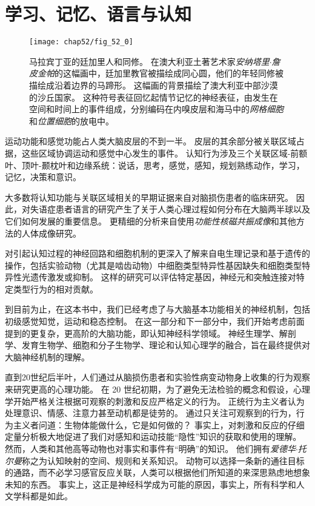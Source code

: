 \part{学习、记忆、语言与认知}


\begin{figure}[htbp]
	\centering
	\texttt{[image: chap52/fig\_52\_0]}
	\caption{马拉宾丁亚的廷加里人和同修。
		在澳大利亚土著艺术家\textit{安纳塔里$\cdot$詹皮金帕}的这幅画中，廷加里教官被描绘成同心圆，他们的年轻同修被描绘成沿着边界的马蹄形。
		这幅画的背景描绘了澳大利亚中部沙漠的沙丘国家。
		这种符号表征回忆起情节记忆的神经表征，由发生在空间和时间上的事件组成，分别编码在内嗅皮层和海马中的\textit{网格细胞}和\textit{位置细胞}的放电中。}
	\label{fig:52_0}
\end{figure}


运动功能和感觉功能占人类大脑皮层的不到一半。
皮层的其余部分被关联区域占据，这些区域协调运动和感觉中心发生的事件。
认知行为涉及三个关联区域-前额叶、顶叶-颞枕叶和边缘系统：说话，思考，感觉，感知，规划熟练动作，学习，记忆，决策和意识。


大多数将认知功能与关联区域相关的早期证据来自对脑损伤患者的临床研究。
因此，对失语症患者语言的研究产生了关于人类心理过程如何分布在大脑两半球以及它们如何发展的重要信息。
更精细的分析来自使用\textit{功能性核磁共振成像}和其他方法的人体成像研究。


对引起认知过程的神经回路和细胞机制的更深入了解来自电生理记录和基于遗传的操作，包括实验动物（尤其是啮齿动物）中细胞类型特异性基因缺失和细胞类型特异性光遗传激发或抑制。
这样的研究可以评估特定基因，神经元和突触连接对特定类型行为的相对贡献。


到目前为止，在这本书中，我们已经考虑了与大脑基本功能相关的神经机制，包括初级感觉知觉，运动和稳态控制。
在这一部分和下一部分中，我们开始考虑前面提到的更复杂，更高阶的大脑功能，即认知神经科学领域。
神经生理学、解剖学、发育生物学、细胞和分子生物学、理论和认知心理学的融合，旨在最终提供对大脑神经机制的理解。


直到20世纪后半叶，人们通过从脑损伤患者和实验性病变动物身上收集的行为观察来研究更高的心理功能。
在 20 世纪初期，为了避免无法检验的概念和假设，心理学开始严格关注根据可观察的刺激和反应严格定义的行为。
正统行为主义者认为处理意识、情感、注意力甚至动机都是徒劳的。
通过只关注可观察到的行为，行为主义者问道：生物体能做什么，它是如何做的？
事实上，对刺激和反应的仔细定量分析极大地促进了我们对感知和运动技能“隐性”知识的获取和使用的理解。
然而，人类和其他高等动物也对事实和事件有“明确”的知识。
他们拥有\textit{爱德华$\cdot$托尔曼}称之为认知映射的空间、规则和关系知识。
动物可以选择一条新的通往目标的通路，而不必学习感官反应关联，人类可以根据他们所知道的来深思熟虑地想象未知的东西。
事实上，这正是神经科学成为可能的原因，事实上，所有科学和人文学科都是如此。



